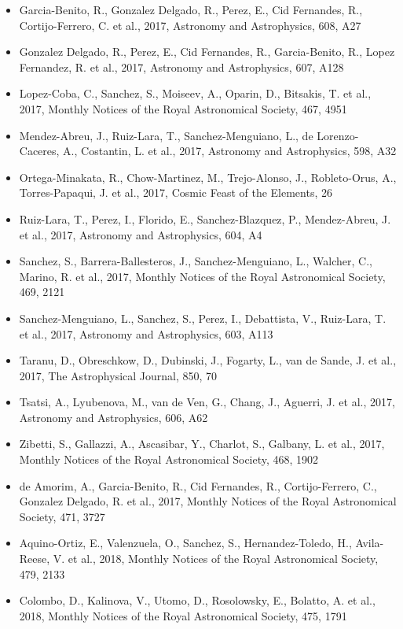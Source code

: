\documentclass{letter}
\begin{document}
\begin{enumerate}
\begin{itemize}
\item Garcia-Benito, R., Gonzalez Delgado, R., Perez, E., Cid Fernandes, R., Cortijo-Ferrero, C. et al., 2017, Astronomy and Astrophysics, 608, A27
\item Gonzalez Delgado, R., Perez, E., Cid Fernandes, R., Garcia-Benito, R., Lopez Fernandez, R. et al., 2017, Astronomy and Astrophysics, 607, A128
\item Lopez-Coba, C., Sanchez, S., Moiseev, A., Oparin, D., Bitsakis, T. et al., 2017, Monthly Notices of the Royal Astronomical Society, 467, 4951
\item Mendez-Abreu, J., Ruiz-Lara, T., Sanchez-Menguiano, L., de Lorenzo-Caceres, A., Costantin, L. et al., 2017, Astronomy and Astrophysics, 598, A32
\item Ortega-Minakata, R., Chow-Martinez, M., Trejo-Alonso, J., Robleto-Orus, A., Torres-Papaqui, J. et al., 2017, Cosmic Feast of the Elements, 26
\item Ruiz-Lara, T., Perez, I., Florido, E., Sanchez-Blazquez, P., Mendez-Abreu, J. et al., 2017, Astronomy and Astrophysics, 604, A4
\item Sanchez, S., Barrera-Ballesteros, J., Sanchez-Menguiano, L., Walcher, C., Marino, R. et al., 2017, Monthly Notices of the Royal Astronomical Society, 469, 2121
\item Sanchez-Menguiano, L., Sanchez, S., Perez, I., Debattista, V., Ruiz-Lara, T. et al., 2017, Astronomy and Astrophysics, 603, A113
\item Taranu, D., Obreschkow, D., Dubinski, J., Fogarty, L., van de Sande, J. et al., 2017, The Astrophysical Journal, 850, 70
\item Tsatsi, A., Lyubenova, M., van de Ven, G., Chang, J., Aguerri, J. et al., 2017, Astronomy and Astrophysics, 606, A62
\item Zibetti, S., Gallazzi, A., Ascasibar, Y., Charlot, S., Galbany, L. et al., 2017, Monthly Notices of the Royal Astronomical Society, 468, 1902
\item de Amorim, A., Garcia-Benito, R., Cid Fernandes, R., Cortijo-Ferrero, C., Gonzalez Delgado, R. et al., 2017, Monthly Notices of the Royal Astronomical Society, 471, 3727
\item Aquino-Ortiz, E., Valenzuela, O., Sanchez, S., Hernandez-Toledo, H., Avila-Reese, V. et al., 2018, Monthly Notices of the Royal Astronomical Society, 479, 2133
\item Colombo, D., Kalinova, V., Utomo, D., Rosolowsky, E., Bolatto, A. et al., 2018, Monthly Notices of the Royal Astronomical Society, 475, 1791

\end{itemize}
\end{enumerate}
\end{document}
